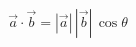 \documentclass[preview]{standalone}
\begin{document}
\begin{align*}
\vec{a}\cdot\vec{b}=|\vec{a}|\,|\vec{b}|\,\cos{\theta}
\end{align*}
\end{document}
